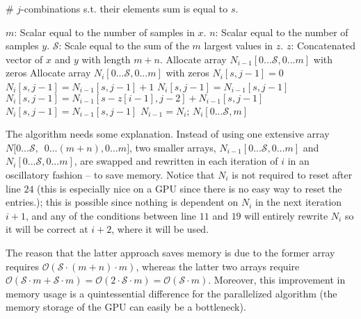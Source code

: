 \documentclass[a4paper,11pt]{article}
\begin{document}
\FloatBarrier
\begin{algorithm}
\caption{\# $j$-combinations s.t. their elements sum is equal to $s$.}
\label{alg:combination}
\begin{algorithmic}[1]
\State $m$: Scalar equal to the number of samples in $x$.
\State $n$: Scalar equal to the number of samples $y$.
\State $\mathcal{S}$: Scale equal to the sum of the $m$ largest values in $z$.
\State $z$: Concatenated vector of $x$ and $y$ with length $m+n$.
    \State Allocate array $N_{i-1}[0...\mathcal{S},0...m]$ with zeros
    \State Allocate array $N_{i}[0...\mathcal{S},0...m]$ with zeros
                  \State $N_{i}[s,j-1]=0$
                  \State $N_{i}[s,j-1]=N_{i-1}[s,j-1] + 1$
                 \State $N_{i}[s,j-1]=N_{i-1}[s,j-1]$
                  \State $N_{i}[s,j-1]=N_{i-1}[s-z[i-1],j-2] + N_{i-1}[s,j-1]$
                 \State $N_{i}[s,j-1]=N_{i-1}[s,j-1]$
                \EndIf
            \EndFor
        \EndFor
        \State $N_{i-1} = N_{i}$; 
    \EndFor
        \State \Return $N_{i}[0...\mathcal{S},m]$ 

    \EndProcedure
\end{algorithmic}
\end{algorithm}
\FloatBarrier

The algorithm needs some explanation. Instead of using one extensive array $N[0\ldots \mathcal{S},$\ $0\ldots(m+n),0\ldots m]$, two smaller arrays, $N_{i-1}[0...\mathcal{S},0...m]$ and $N_{i}[0...\mathcal{S},0...m]$, are swapped and rewritten in each iteration of $i$ in an oscillatory fashion – to save memory. Notice that $N_{i}$ is not required to reset after line $24$ (this is especially nice on a GPU since there is no easy way to reset the entries.); this is possible since nothing is dependent on $N_{i}$ in the next iteration $i+1$, and any of the conditions between line $11$ and $19$ will entirely rewrite $N_{i}$ so it will be correct at $i+2$, where it will be used.

The reason that the latter approach saves memory is due to the former array requires $\mathcal{O}(\mathcal{S} \cdot (m+n) \cdot m)$, whereas the latter two arrays require $\mathcal{O}(\mathcal{S} \cdot m + \mathcal{S} \cdot m) = \mathcal{O}( 2 \cdot \mathcal{S} \cdot m)=\mathcal{O}(\mathcal{S} \cdot m)$. Moreover, this improvement in memory usage is a quintessential difference for the parallelized algorithm (the memory storage of the GPU can easily be a bottleneck).
\end{document}
